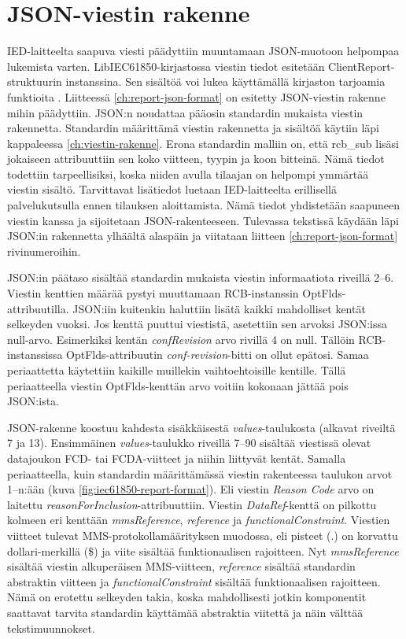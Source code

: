 \section{JSON-viestin rakenne}
IED-laitteelta saapuva viesti päädyttiin muuntamaan JSON-muotoon helpompaa lukemista varten. LibIEC61850-kirjastossa viestin tiedot esitetään ClientReport-struk\-tuu\-rin instanssina. Sen sisältöä voi lukea käyttämällä kirjaston tarjoamia funktioita \cite{libIEC61850-doc}.  Liitteessä \ref{ch:report-json-format} on esitetty JSON-viestin rakenne mihin päädyttiin. JSON:n noudattaa pääosin standardin mukaista viestin rakennetta. Standardin määrittämä viestin rakennetta ja sisältöä käytiin läpi kappaleessa \ref{ch:viestin-rakenne}. Erona standardin malliin on, että rcb\_sub lisäsi jokaiseen attribuuttiin sen koko viitteen, tyypin ja koon bitteinä. Nämä tiedot todettiin tarpeellisiksi, koska niiden avulla tilaajan on helpompi ymmärtää viestin sisältö. Tarvittavat lisätiedot luetaan IED-laitteelta erillisellä palvelukutsulla ennen tilauksen aloittamista. Nämä tiedot yhdistetään saapuneen viestin kanssa ja sijoitetaan JSON-rakenteeseen. Tulevassa tekstissä käydään läpi JSON:in rakennetta ylhäältä alaspäin ja viitataan liitteen \ref{ch:report-json-format} rivinumeroihin.

JSON:in päätaso sisältää standardin mukaista viestin informaatiota riveillä 2--6. Viestin kenttien määrää pystyi muuttamaan RCB-instanssin OptFlds-attribuutilla. JSON:iin kuitenkin haluttiin lisätä kaikki mahdolliset kentät selkeyden vuoksi. Jos kenttä puuttui viestistä, asetettiin sen arvoksi JSON:issa null-arvo. Esimerkiksi kentän \emph{confRevision} arvo rivillä 4 on null. Tällöin RCB-instanssissa OptFlds-attribuutin \emph{conf-revision}-bitti on ollut epätosi. Samaa periaattetta käytettiin kaikille muillekin vaihtoehtoisille kentille. Tällä periaatteella viestin OptFlds-kenttän arvo voitiin kokonaan jättää pois JSON:ista.

JSON-rakenne koostuu kahdesta sisäkkäisestä \emph{values}-taulukosta (alkavat riveiltä 7 ja 13). Ensimmäinen \emph{values}-taulukko riveillä 7--90 sisältää viestissä olevat datajoukon FCD- tai FCDA-viitteet ja niihin liittyvät kentät. Samalla periaatteella, kuin standardin määrittämässä viestin rakenteessa taulukon arvot 1--n:ään (kuva \ref{fig:iec61850-report-format}). Eli viestin \emph{Reason Code} arvo on laitettu \emph{reasonForInclusion}-attribuuttiin. Viestin \emph{DataRef}-kenttä on pilkottu kolmeen eri kenttään \emph{mmsReference}, \emph{reference} ja \emph{functionalConstraint}. Viestien viitteet tulevat MMS-protokollamäärityksen muodossa, eli pisteet (.) on korvattu dollari-merkillä (\$) ja viite sisältää funktionaalisen rajoitteen. Nyt \emph{mmsReference} sisältää viestin alkuperäisen MMS-viitteen, \emph{reference} sisältää standardin abstraktin viitteen ja \emph{functionalConstraint} sisältää funktionaalisen rajoitteen. Nämä on erotettu selkeyden takia, koska mahdollisesti jotkin komponentit saattavat tarvita standardin käyttämää abstraktia viitettä ja näin välttää tekstimuunnokset.

